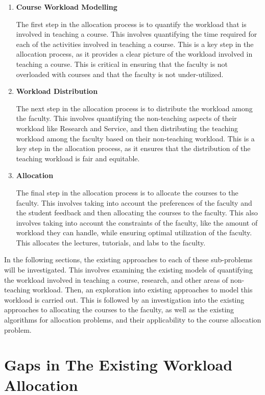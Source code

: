 \begin{enumerate}
  \item \textbf{Course Workload Modelling}

        The first step in the allocation process is to quantify the workload that is involved in teaching a course. This involves quantifying the time required for each of the activities involved in teaching a course. This is a key step in the allocation process, as it provides a clear picture of the workload involved in teaching a course. This is critical in ensuring that the faculty is not overloaded with courses and that the faculty is not under-utilized.

  \item \textbf{Workload Distribution}

        The next step in the allocation process is to distribute the workload among the faculty. This involves quantifying the non-teaching aspects of their workload like Research and Service, and then distributing the teaching workload among the faculty based on their non-teaching workload. This is a key step in the allocation process, as it ensures that the distribution of the teaching workload is fair and equitable.

  \item \textbf{Allocation}

        The final step in the allocation process is to allocate the courses to the faculty. This involves taking into account the preferences of the faculty and the student feedback and then allocating the courses to the faculty. This also involves taking into account the constraints of the faculty, like the amount of workload they can handle, while ensuring optimal utilization of the faculty. This allocates the lectures, tutorials, and labs to the faculty.

\end{enumerate}

In the following sections, the existing approaches to each of these sub-problems will be investigated. This involves examining the existing models of quantifying the workload involved in teaching a course, research, and other areas of non-teaching workload. Then, an exploration into existing approaches to model this workload is carried out. This is followed by an investigation into the existing approaches to allocating the courses to the faculty, as well as the existing algorithms for allocation problems, and their applicability to the course allocation problem.

\section{Gaps in The Existing Workload Allocation}


